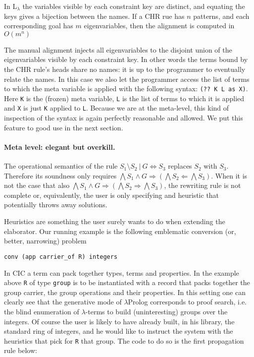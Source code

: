 \documentclass{easychair}
\begin{document}
In L$_\lambda$ the variables visible by each constraint key are distinct,
and equating the keys gives a bijection between the names.
If a CHR rue has $n$ patterns, and each corresponding goal has $m$
eigenvariables, then the alignment is computed in $O(m^n)$

The manual alignment injects all eigenvariables to the disjoint union
of the eigenvariables visible by each constraint key.  In other words
the terms bound by the CHR rule's heads share no names: it is
up to the programmer to eventually relate the names.
In this case we also let the programmer access the list of terms
to which the meta variable is applied with the following syntax:
\verb+(?? K L as X)+.  Here \verb+K+ is the (frozen) meta variable,
\verb+L+ is the list of terms to which it is applied and \verb+X+ is just
\verb+K+ applied to \verb+L+. Because we are at the meta-level, this kind of
inspection of the syntax is again perfectly reasonable and allowed.
We put this feature to good use in the next section.

\paragraph{Meta level: elegant but overkill.}

The operational semantics of the rule
$S_1 \setminus S_2 ~|~ G \iff S_3$ replaces $S_2$ with $S_3$.
Therefore its soundness only requires
$\bigwedge S_1 \wedge G \Rightarrow (\bigwedge
S_2 \Leftarrow \bigwedge S_3)$. When it is not the case that also
$\bigwedge S_1 \wedge G \Rightarrow (\bigwedge S_2 \Rightarrow \bigwedge S_3)$,
the rewriting rule is not complete or, equivalently, the user is only specifying and heuristic that potentially throws away solutions.

Heuristics are something the user surely wants to
do when extending the elaborator.  Our running example
is the following emblematic conversion (or, better, narrowing) problem

\begin{Verbatim}
conv (app carrier_of R) integers
\end{Verbatim}

In CIC a term can pack together types, terms and properties.  In the
example above \verb+R+ of type \verb+group+ is to be instantiated with a record
that packs together the group carrier, the group operations and their properties.
In this setting one can clearly see that the generative mode of $\lambda$Prolog corresponds to proof search, i.e. the blind enumeration of $\lambda$-terms to build (uninteresting) groups over the integers.  Of course the user is likely to have already built, in his library, the standard ring of integers, and he would like to instruct the system with the heuristics that pick for \verb+R+ that group. The code to do so is the first propagation rule below:
\end{document}
